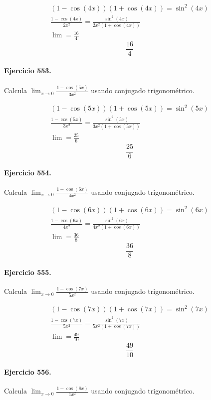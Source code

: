 \documentclass[11pt,a4paper]{article}
\begin{document}
\[
\begin{aligned}
(1-\cos(4x))(1+\cos(4x))=\sin^2(4x)\\
\frac{1-\cos(4x)}{2x^2}=\frac{\sin^2(4x)}{2x^2(1+\cos(4x))}\\
\lim=\frac{16}{4}
\end{aligned}
\]
\[\boxed{\frac{16}{4}}\]


\paragraph{Ejercicio 553.} Calcula $\displaystyle\lim_{x\to0}\frac{1-\cos(5x)}{3x^2}$ usando conjugado trigonométrico.

\[
\begin{aligned}
(1-\cos(5x))(1+\cos(5x))=\sin^2(5x)\\
\frac{1-\cos(5x)}{3x^2}=\frac{\sin^2(5x)}{3x^2(1+\cos(5x))}\\
\lim=\frac{25}{6}
\end{aligned}
\]
\[\boxed{\frac{25}{6}}\]


\paragraph{Ejercicio 554.} Calcula $\displaystyle\lim_{x\to0}\frac{1-\cos(6x)}{4x^2}$ usando conjugado trigonométrico.

\[
\begin{aligned}
(1-\cos(6x))(1+\cos(6x))=\sin^2(6x)\\
\frac{1-\cos(6x)}{4x^2}=\frac{\sin^2(6x)}{4x^2(1+\cos(6x))}\\
\lim=\frac{36}{8}
\end{aligned}
\]
\[\boxed{\frac{36}{8}}\]


\paragraph{Ejercicio 555.} Calcula $\displaystyle\lim_{x\to0}\frac{1-\cos(7x)}{5x^2}$ usando conjugado trigonométrico.

\[
\begin{aligned}
(1-\cos(7x))(1+\cos(7x))=\sin^2(7x)\\
\frac{1-\cos(7x)}{5x^2}=\frac{\sin^2(7x)}{5x^2(1+\cos(7x))}\\
\lim=\frac{49}{10}
\end{aligned}
\]
\[\boxed{\frac{49}{10}}\]


\paragraph{Ejercicio 556.} Calcula $\displaystyle\lim_{x\to0}\frac{1-\cos(8x)}{1x^2}$ usando conjugado trigonométrico.
\end{document}
